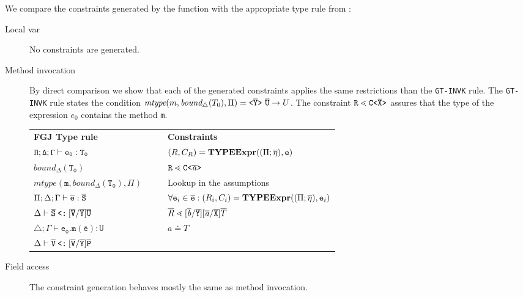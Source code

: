 \documentclass[a4paper,USenglish,cleveref, autoref, thm-restate, anonymous]{lipics-v2021}
\begin{document}
We compare the constraints generated by the \typeExpr function with the appropriate type rule from \TFGJ:
\begin{description}
  \item [Local var]
  No constraints are generated.
  \item[Method invocation]
By direct comparison we show that each of the generated constraints applies the same restrictions than the \texttt{GT-INVK} rule.
The \texttt{GT-INVK} rule states the condition $\textit{mtype}(m, \textit{bound}_\triangle(T_0), \Pi) = \mathtt{ \texttt{<} \overline{\tt Y} \texttt{>} }\ \overline{\tt U} \to U$.
The constraint $\texttt{R} \lessdot \mathtt{C \texttt{<} \overline{\tt X} \texttt{>} }$ assures that the type of the expression $e_0$ contains the method \texttt{m}.

\begin{small}
\begin{tabularx}{\linewidth}{lX|Xl}
  \textbf{FGJ Type rule} &&& \textbf{Constraints} \\
  $\mathtt{\Pi;\Delta;\Gamma \vdash e_0 : T_0 }$ &&&
    $({R}, C_R) = \textbf{TYPEExpr}(({\Pi} ;\overline{\mathtt{\eta}}), \texttt{e})$\\ 
  $\mathtt{\mathit{bound}_\Delta (T_0)}$ &&& $\texttt{R} \lessdot \mathtt{C \texttt{<} \overline{\tt \mathit{ a }} \texttt{>} }$ \\
  $\mathtt{\mathit{mtype}(m, \mathit{bound}_\Delta (T_0), \Pi)}$ &&& Lookup in the assumptions \\
 $\Pi;\Delta;\Gamma \vdash \overline{\tt e} : \overline{\tt S}$ &&& $\forall \texttt{e}_i \in \overline{\tt e} : (R_i, C_i) = \textbf{TYPEExpr}(({\Pi} ;
 \overline{\mathtt{\eta}}), \texttt{e}_i)$\\
 $\Delta \vdash \overline{\tt S} \mathbin{\texttt{<:}}  [\overline{\tt V}/\overline{\tt Y}]\overline{\tt U}$ &&& $ \overline{R} \lessdot [\overline{\tt \mathit{ b }}/\overline{\tt Y}][\overline{\tt \mathit{ a }}/\overline{\tt X}]\overline{T}$\\
 $\triangle; \Gamma \vdash \mathtt{e_0.m(\overline{e}) : U }$ &&& $a \doteq T$ \\
 $\Delta \vdash \overline{\tt V} \mathbin{\texttt{<:}}  [\overline{\tt V}/\overline{\tt Y}]\overline{\tt P}$ &&& 
\end{tabularx}
\end{small}

 \item[Field access]
The constraint generation behaves mostly the same as method invocation.


\end{description}
\end{document}
